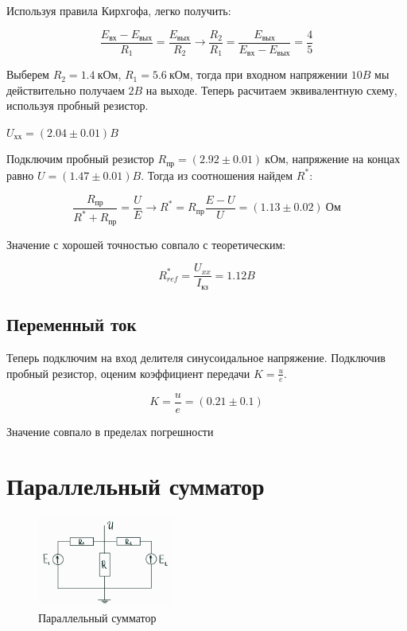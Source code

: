 \documentclass[a4paper]{article}
\begin{document}
Используя правила Кирхгофа, легко получить:

\begin{equation}
    \frac{E_\text{вх} - E_\text{вых}}{R_1} = \frac{E_\text{вых}}{R_2} \longrightarrow \frac{R_2}{R_1} = \frac{E_\text{вых}}{E_\text{вх} - E_\text{вых}} = \frac{4}{5}
\end{equation}

Выберем $R_2 = 1.4 \ \text{кОм}$, $R_1 = 5.6 \ \text{кОм}$,
тогда при входном напряжении $10B$ мы действительно получаем $2B$ на выходе.
Теперь расчитаем эквивалентную схему, используя пробный резистор.

$U_\text{хх} = (2.04 \pm 0.01)B$

Подключим пробный резистор $R_\text{пр} = (2.92 \pm 0.01)\ \text{кОм}$,
напряжение на концах равно $U = (1.47 \pm 0.01)B$. Тогда из соотношения найдем $R^*$:

\begin{equation}
    \frac{R_\text{пр}}{R^* + R_\text{пр}} = \frac{U}{E} \longrightarrow R^* = R_\text{пр} \frac{E - U}{U} = (1.13 \pm 0.02) \ \text{Ом}
\end{equation}

Значение с хорошей точностью совпало с теоретическим:

\begin{equation}
    R^*_{ref} = \frac{U_{xx}}{I_\text{кз}} = 1.12B
\end{equation}

\subsection{Переменный ток}

Теперь подключим на вход делителя синусоидальное напряжение.
Подключив пробный резистор, оценим коэффициент передачи $K = \frac{u}{e}$.

\begin{equation}
    K = \frac{u}{e} = (0.21 \pm 0.1)
\end{equation}

Значение совпало в пределах погрешности

\section{Параллельный сумматор}

\begin{figure}
    \includegraphics[width = 0.40\textwidth]{summator.png}
    \caption[width = 0.90\textwidth]{Параллельный сумматор}
\end{figure}
\end{document}
